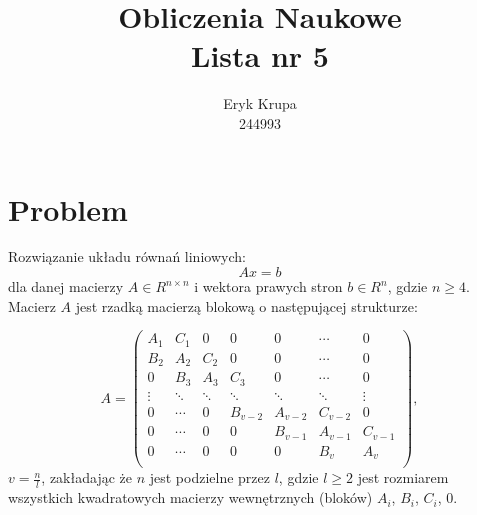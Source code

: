 \documentclass[12pt]{article}
\title{Obliczenia Naukowe \\ \large Lista nr 5}
\author{Eryk Krupa \\ 244993}
\date{}
\begin{document}
\renewcommand{\familydefault}{\sfdefault}
\maketitle
\newpage


\section{Problem}
Rozwiązanie układu równań liniowych: $$Ax = b$$
dla danej macierzy $A \in R^{n\times n}$ 
i wektora prawych stron $b \in R^n$, gdzie $n \geq 4$. \\

Macierz $A$ jest rzadką macierzą blokową o następującej strukturze:

\begin{equation}
A = 
\left(\begin{array}{ccccccc}
A_1 & C_1 & 0 & 0 & 0 & \cdots & 0 \\
B_2 & A_2 & C_2 & 0 & 0  & \cdots & 0 \\
0  & B_3 & A_3 & C_3 & 0  & \cdots & 0 \\
\vdots & \ddots & \ddots & \ddots & \ddots & \ddots & \vdots\\
0   & \cdots & 0  & B_{v-2} & A_{v-2} & C_{v-2} & 0 \\
0  & \cdots & 0  &  0 &B_{v-1} & A_{v-1} & C_{v-1}  \\
0  & \cdots & 0 & 0 & 0& B_{v} & A_{v}  \\ 
\end{array}\right),
\end{equation} 
$v = \frac{n}{l}$, zakładając że $n$ jest podzielne przez $l$, gdzie $l \geq 2$ jest rozmiarem wszystkich kwadratowych macierzy wewnętrznych (bloków) $A_i$, $B_i$, $C_i$, $0$. 
\end{document}
